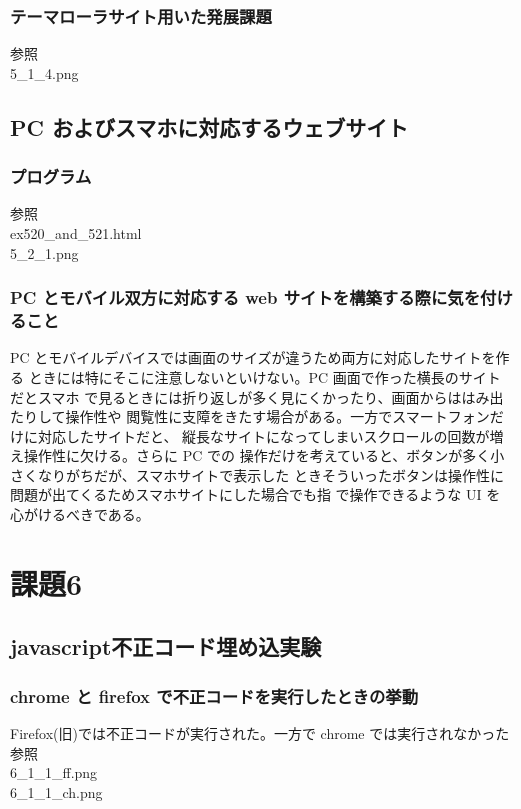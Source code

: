 \documentclass[a4j]{jarticle}
\begin{document}
      \subsubsection{テーマローラサイト用いた発展課題}
        参照\\
        5\_1\_4.png
    \subsection{PC およびスマホに対応するウェブサイト}
      \subsubsection{プログラム}
        参照\\
         ex520\_and\_521.html\\
        5\_2\_1.png
      \subsubsection{PC とモバイル双方に対応する web サイトを構築する際に気を付けること}
            PC とモバイルデバイスでは画面のサイズが違うため両方に対応したサイトを作る
        ときには特にそこに注意しないといけない。PC 画面で作った横長のサイトだとスマホ
        で見るときには折り返しが多く見にくかったり、画面からははみ出たりして操作性や
        閲覧性に支障をきたす場合がある。一方でスマートフォンだけに対応したサイトだと、
        縦長なサイトになってしまいスクロールの回数が増え操作性に欠ける。さらに PC での
        操作だけを考えていると、ボタンが多く小さくなりがちだが、スマホサイトで表示した
        ときそういったボタンは操作性に問題が出てくるためスマホサイトにした場合でも指
        で操作できるような UI を心がけるべきである。
  \section{課題6}
    \subsection{javascript不正コード埋め込実験}
      \subsubsection{chrome と firefox で不正コードを実行したときの挙動}
        Firefox(旧)では不正コードが実行された。一方で chrome では実行されなかった\\
        参照\\
        6\_1\_1\_ff.png\\
        6\_1\_1\_ch.png
\end{document}
